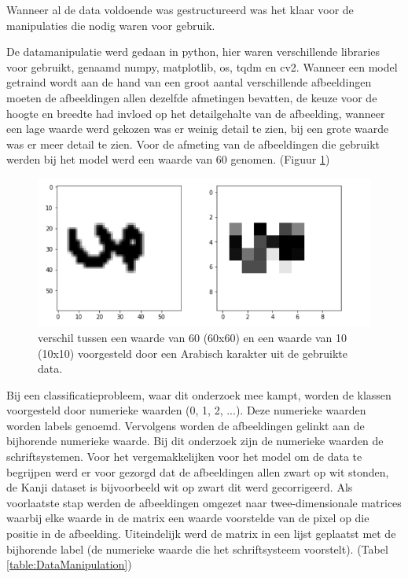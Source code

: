Wanneer al de data voldoende was gestructureerd was het klaar voor de manipulaties die nodig waren voor gebruik.

De datamanipulatie werd gedaan in python, hier waren verschillende libraries voor gebruikt, genaamd numpy, matplotlib, os, tqdm en cv2.
Wanneer een model getraind wordt aan de hand van een groot aantal verschillende afbeeldingen moeten de afbeeldingen allen dezelfde afmetingen bevatten, de keuze voor de hoogte en breedte had invloed op het detailgehalte van de afbeelding, wanneer een lage waarde werd gekozen was er weinig detail te zien, bij een grote waarde was er meer detail te zien.
Voor de afmeting van de afbeeldingen die gebruikt werden bij het model werd een waarde van 60 genomen. (Figuur \ref{tab:afmetingen})


\begin{figure}
    
    
    \includegraphics[width=\linewidth]{img/Afmetingen.png}

    \caption{verschil tussen een waarde van 60 (60x60) en een waarde van 10 (10x10) voorgesteld door een Arabisch karakter uit de gebruikte data.}
    \label{tab:afmetingen}
    
\end{figure}

Bij een classificatieprobleem, waar dit onderzoek mee kampt, worden de klassen voorgesteld door numerieke waarden (0, 1, 2, ...). Deze numerieke waarden worden labels genoemd.
Vervolgens worden de afbeeldingen gelinkt aan de bijhorende numerieke waarde.
Bij dit onderzoek zijn de numerieke waarden de schriftsystemen.
Voor het vergemakkelijken voor het model om de data te begrijpen werd er voor gezorgd dat de afbeeldingen allen zwart op wit stonden, de Kanji dataset is bijvoorbeeld wit op zwart dit werd gecorrigeerd.
Als voorlaatste stap werden de afbeeldingen omgezet naar twee-dimensionale matrices waarbij elke waarde in de matrix een waarde voorstelde van de pixel op die positie in de afbeelding.
Uiteindelijk werd de matrix in een lijst geplaatst met de bijhorende label (de numerieke waarde die het schriftsysteem voorstelt). (Tabel \ref{table:DataManipulation})


